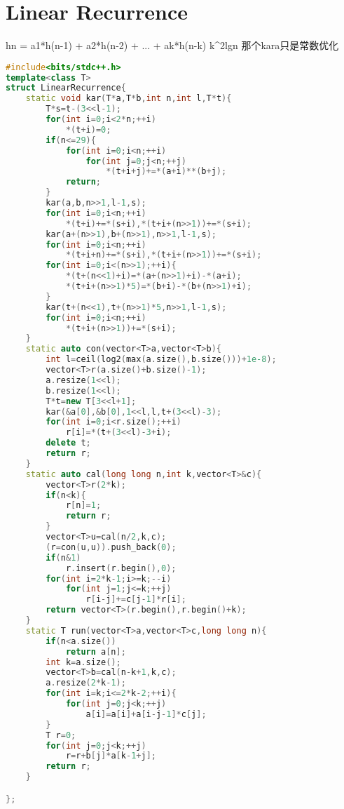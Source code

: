 \documentclass{book}
\begin{document}
\section{Linear Recurrence}

hn = a1*h(n-1) + a2*h(n-2) + ... + ak*h(n-k)
k^2lgn
那个kara只是常数优化
\begin{lstlisting}[language=C++,title={Linear Recurrence.hpp (2118 bytes, 71 lines)}]
#include<bits/stdc++.h>
template<class T>
struct LinearRecurrence{
    static void kar(T*a,T*b,int n,int l,T*t){
        T*s=t-(3<<l-1);
        for(int i=0;i<2*n;++i)
            *(t+i)=0;
        if(n<=29){
            for(int i=0;i<n;++i)
                for(int j=0;j<n;++j)
                    *(t+i+j)+=*(a+i)**(b+j);
            return;
        }
        kar(a,b,n>>1,l-1,s);
        for(int i=0;i<n;++i)
            *(t+i)+=*(s+i),*(t+i+(n>>1))+=*(s+i);
        kar(a+(n>>1),b+(n>>1),n>>1,l-1,s);
        for(int i=0;i<n;++i)
            *(t+i+n)+=*(s+i),*(t+i+(n>>1))+=*(s+i);
        for(int i=0;i<(n>>1);++i){
            *(t+(n<<1)+i)=*(a+(n>>1)+i)-*(a+i);
            *(t+i+(n>>1)*5)=*(b+i)-*(b+(n>>1)+i);
        }
        kar(t+(n<<1),t+(n>>1)*5,n>>1,l-1,s);
        for(int i=0;i<n;++i)
            *(t+i+(n>>1))+=*(s+i);
    }
    static auto con(vector<T>a,vector<T>b){
        int l=ceil(log2(max(a.size(),b.size()))+1e-8);
        vector<T>r(a.size()+b.size()-1);
        a.resize(1<<l);
        b.resize(1<<l);
        T*t=new T[3<<l+1];
        kar(&a[0],&b[0],1<<l,l,t+(3<<l)-3);
        for(int i=0;i<r.size();++i)
            r[i]=*(t+(3<<l)-3+i);
        delete t;
        return r;
    }
    static auto cal(long long n,int k,vector<T>&c){
        vector<T>r(2*k);
        if(n<k){
            r[n]=1;
            return r;
        }
        vector<T>u=cal(n/2,k,c);
        (r=con(u,u)).push_back(0);
        if(n&1)
            r.insert(r.begin(),0);
        for(int i=2*k-1;i>=k;--i)
            for(int j=1;j<=k;++j)
                r[i-j]+=c[j-1]*r[i];
        return vector<T>(r.begin(),r.begin()+k);
    }
    static T run(vector<T>a,vector<T>c,long long n){
        if(n<a.size())
            return a[n];
        int k=a.size();
        vector<T>b=cal(n-k+1,k,c);
        a.resize(2*k-1);
        for(int i=k;i<=2*k-2;++i){
            for(int j=0;j<k;++j)
                a[i]=a[i]+a[i-j-1]*c[j];
        }
        T r=0;
        for(int j=0;j<k;++j)
            r=r+b[j]*a[k-1+j];
        return r;
    }

};
\end{lstlisting}
\end{document}
